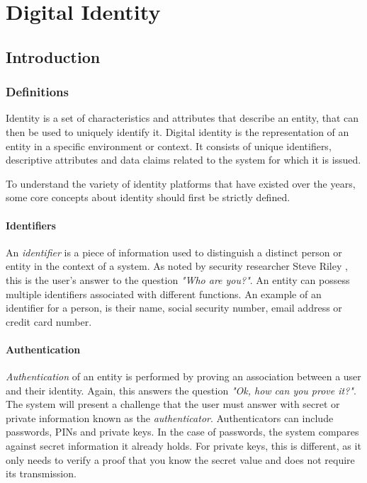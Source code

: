 \chapter{Digital Identity}
\section{Introduction}
\subsection{Definitions}
Identity is a set of characteristics and attributes that describe an entity, that can then be used to uniquely identify it. Digital identity is the representation of an entity in a specific environment or context. It consists of unique identifiers, descriptive attributes and data claims related to the system for which it is issued.

To understand the variety of identity platforms that have existed over the years, some core concepts about identity should first be strictly defined.

\subsubsection{Identifiers}
An \textit{identifier} is a piece of information used to distinguish a distinct person or entity in the context of a system. As noted by security researcher Steve Riley \cite{riley_its_2006}, this is the user's answer to the question \textit{"Who are you?"}. An entity can possess multiple identifiers associated with different functions. An example of an identifier for a person, is their name, social security number, email address or credit card number.

\subsubsection{Authentication}
\textit{Authentication} of an entity is performed by proving an association between a user and their identity. Again, this answers the question \textit{"Ok, how can you prove it?"}. The system will present a challenge that the user must answer with secret or private information known as the \textit{authenticator}. Authenticators can include passwords, PINs and private keys. In the case of passwords, the system compares against secret information it already holds. For private keys, this is different, as it only needs to verify a proof that you know the secret value and does not require its transmission.

